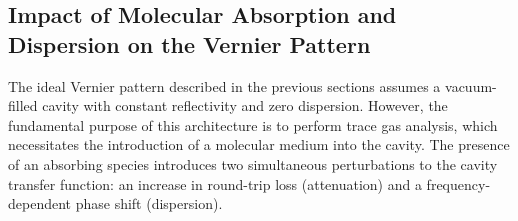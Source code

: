 \documentclass[12pt]{report}
\begin{document}
%	
%	
	
	\subsection{Impact of Molecular Absorption and Dispersion on the Vernier Pattern}
	
	The ideal Vernier pattern described in the previous sections assumes a vacuum-filled cavity with constant reflectivity and zero dispersion. However, the fundamental purpose of this architecture is to perform trace gas analysis, which necessitates the introduction of a molecular medium into the cavity. The presence of an absorbing species introduces two simultaneous perturbations to the cavity transfer function: an increase in round-trip loss (attenuation) and a frequency-dependent phase shift (dispersion).
	
\end{document}
